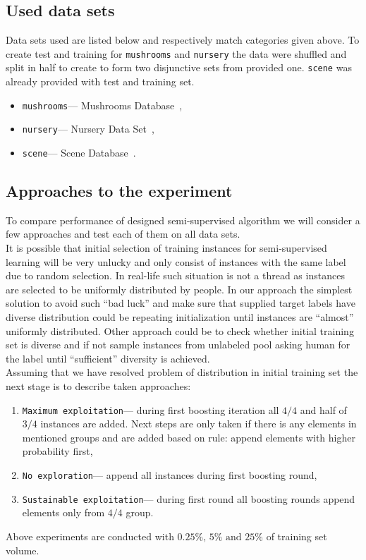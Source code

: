 \documentclass[12pt, a4paper, pdflatex]{report}
\begin{document}
\subsection{Used data sets}
Data sets used are listed below and respectively match categories given above. To create test and training for \texttt{mushrooms} and \texttt{nursery} the data were shuffled and split in half to create to form two disjunctive sets from provided one. \texttt{scene} was already provided with test and training set.
\begin{itemize}
\item \texttt{mushrooms}--- Mushrooms Database~\cite{mushroomsDS},
\item \texttt{nursery}--- Nursery Data Set~\cite{nurseryDS},
\item \texttt{scene}--- Scene Database~\cite{sceneDS}.
\end{itemize}

\subsection{Approaches to the experiment}
To compare performance of designed semi-supervised algorithm we will consider a few approaches and test each of them on all data sets.\\
It is possible that initial selection of training instances for semi-supervised learning will be very unlucky and only consist of instances with the same label due to random selection. 
In real-life such situation is not a thread as instances are selected to be uniformly distributed by people. 
In our approach the simplest solution to avoid such ``bad luck'' and make sure that supplied target labels have diverse distribution could be repeating initialization until instances are ``almost'' uniformly distributed. Other approach  could be to check whether initial training set is diverse and if not sample instances from unlabeled pool asking human for the label until ``sufficient'' diversity is achieved.\\

Assuming that we have resolved problem of distribution in initial training set the next stage is to describe taken approaches:
\begin{enumerate}
\item \texttt{Maximum exploitation}--- during first boosting iteration all $4/4$ and half of $3/4$ instances are added. Next steps are only taken if there is any elements in mentioned groups and are added based on rule: append elements with higher probability first,
\item \texttt{No exploration}--- append all instances during first boosting round,
\item \texttt{Sustainable exploitation}--- during first round all boosting rounds append elements only from $4/4$ group.
\end{enumerate}
Above experiments are conducted with $0.25\%\text{, } 5\% \text{ and } 25\%$ of training set volume.
\end{document}
